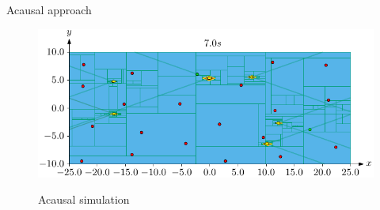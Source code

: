 \documentclass{beamer}
\begin{document}
            \begin{frame}{Acausal approach}
                \begin{figure}
                    \centering
                    \href{run:acausal.mp4?autostart}{\includegraphics[width=\textwidth]{imgs/acausal_cover}}
                    \caption{Acausal simulation}
                \end{figure}
            \end{frame}

            





            

        


\end{document}
